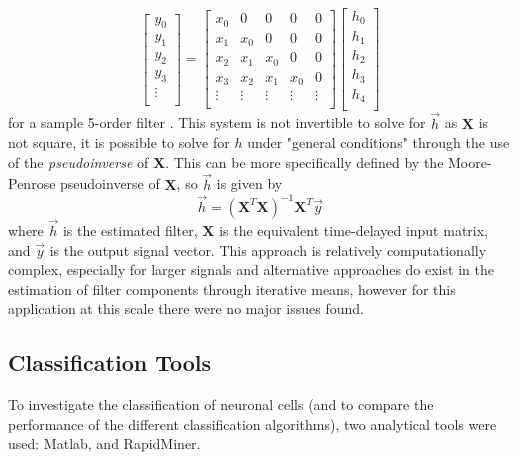 \[
\begin{bmatrix}
    y_{0} \\
    y_{1} \\
    y_{2} \\
    y_{3} \\
    \vdots \\
\end{bmatrix}
=
\begin{bmatrix}
    x_{0} &    0  &    0 &     0  &    0 \\
    x_{1} & x_{0} &    0 &     0  &    0 \\
    x_{2} & x_{1} & x_{0} &    0  &    0 \\
    x_{3} & x_{2} & x_{1} & x_{0} &    0 \\
    \vdots & \vdots & \vdots & \vdots & \vdots \\
\end{bmatrix}
\begin{bmatrix}
    h_{0} \\
    h_{1} \\
    h_{2} \\
    h_{3} \\
    h_{4} \\
\end{bmatrix}
\]
for a sample 5-order filter \cite{sysIdC}. This system is not invertible to solve for $\vec{h}$ as $\boldsymbol{X}$ is not square, it is possible to solve for $h$ under "general conditions" through the use of the \emph{pseudoinverse} of $\boldsymbol{X}$. This can be more specifically defined by the Moore-Penrose pseudoinverse of $\boldsymbol{X}$, so $\vec{h}$ is given by
\begin{equation}
    \label{eq:estFilter}
    \vec{h} = (\boldsymbol{X}^{T}\boldsymbol{X})^{-1}\boldsymbol{X}^{T}\vec{y}
\end{equation}
where $\vec{h}$ is the estimated filter, $\boldsymbol{X}$ is the equivalent time-delayed input matrix, and $\vec{y}$ is the output signal vector. This approach is relatively computationally complex, especially for larger signals and alternative approaches do exist in the estimation of filter components through iterative means, however for this application at this scale there were no major issues found.

\subsection{Classification Tools}

To investigate the classification of neuronal cells (and to compare the performance of the different classification algorithms), two analytical tools were used: Matlab, and RapidMiner.\\

